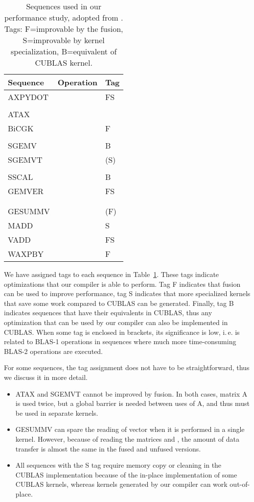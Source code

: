 \documentclass[final]{siamltex}
\def\ie{i.\,e.}
\begin{document}
{\begin{table}
	\centering
	\small
	\begin{tabular}{|l|l|l|}
		\hline
		Sequence & Operation & Tag \\
		\hline
		AXPYDOT &  & FS \\ 
		&  & \\
		ATAX &  & \\
		BiCGK &  & F \\
		&  & \\
		SGEMV &  & B \\ 
		SGEMVT &  & (S) \\
		&  & \\
		SSCAL &  & B \\
		GEMVER &  & FS \\
		&  & \\
		&  & \\
		GESUMMV &  & (F) \\
		MADD &  & S \\
		VADD &  & FS \\
		WAXPBY &  & F \\
		\hline
	\end{tabular}
	\caption{Sequences used in our performance study, adopted from \cite{belter2009automating}. Tags: F=improvable by the fusion, S=improvable by kernel specialization, B=equivalent of CUBLAS kernel.}
	\label{tab:kernels}
\end{table}

We have assigned tags to each sequence in Table~\ref{tab:kernels}. These tags indicate optimizations that our compiler is able to perform. Tag F indicates that fusion can be used to improve performance, tag S indicates that more specialized kernels that save some work compared to CUBLAS can be generated. Finally, tag B indicates sequences that have their equivalents in CUBLAS, thus any optimization that can be used by our compiler can also be implemented in CUBLAS. When some tag is enclosed in brackets, its significance is low, \ie{} is related to BLAS-1 operations in sequences where much more time-consuming BLAS-2 operations are executed.

For some sequences, the tag assignment does not have to be straightforward, thus we discuss it in more detail.
\begin{itemize}
	\item ATAX and SGEMVT cannot be improved by fusion. In both cases, matrix A is used twice, but a global barrier is needed between uses of A, and thus must be used in separate kernels.
	\item GESUMMV can spare the reading of vector  when it is performed in a single kernel. However, because of reading the matrices  and , the amount of data transfer is almost the same in the fused and unfused versions.
	\item All sequences with the S tag require memory copy or cleaning in the CUBLAS implementation because of the in-place implementation of some CUBLAS kernels, whereas kernels generated by our compiler can work out-of-place.
\end{itemize}

}
\end{document}
